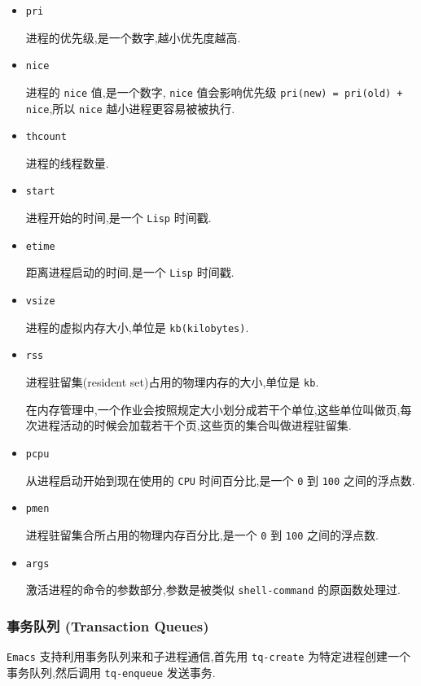\documentclass[11pt]{article}
\begin{document}
\begin{itemize}
\item \texttt{pri}

进程的优先级,是一个数字,越小优先度越高.

\item \texttt{nice}

进程的 \texttt{nice} 值,是一个数字, \texttt{nice} 值会影响优先级 \texttt{pri(new) = pri(old) + nice},所以 \texttt{nice} 越小进程更容易被被执行.

\item \texttt{thcount}

进程的线程数量.

\item \texttt{start}

进程开始的时间,是一个 \texttt{Lisp} 时间戳.

\item \texttt{etime}

距离进程启动的时间,是一个 \texttt{Lisp} 时间戳.

\item \texttt{vsize}

进程的虚拟内存大小,单位是 \texttt{kb(kilobytes)}.

\item \texttt{rss}

进程驻留集(resident set)占用的物理内存的大小,单位是 \texttt{kb}.

在内存管理中,一个作业会按照规定大小划分成若干个单位,这些单位叫做页,每次进程活动的时候会加载若干个页,这些页的集合叫做进程驻留集.

\item \texttt{pcpu}

从进程启动开始到现在使用的 \texttt{CPU} 时间百分比,是一个 \texttt{0} 到 \texttt{100} 之间的浮点数.

\item \texttt{pmen}

进程驻留集合所占用的物理内存百分比,是一个 \texttt{0} 到 \texttt{100} 之间的浮点数.

\item \texttt{args}

激活进程的命令的参数部分,参数是被类似 \texttt{shell-command} 的原函数处理过.
\end{itemize}


\subsubsection{事务队列 (Transaction Queues)}
\label{sec:orga0c4cf0}

\texttt{Emacs} 支持利用事务队列来和子进程通信,首先用 \texttt{tq-create} 为特定进程创建一个事务队列,然后调用 \texttt{tq-enqueue} 发送事务.
\end{document}
